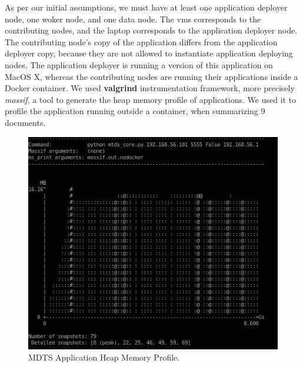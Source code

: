 \documentclass[12pt, titlepage]{uo_temp}
\begin{document}
     As per our initial assumptions, we must have at least one application deployer node,
     one woker node, and one data node. The \gls{vm}s corresponds to the contributing
     nodes, and the laptop corresponds to the application deployer node. The contributing
     node's copy of the application differs from the application deployer copy, because
     they are not allowed to instantiate application deploying nodes. The application
     deployer is running a version of this application on MacOS X, whereas the
     contributing nodes are running their applications inside a Docker container. We used
     \textbf{valgrind} instrumentation framework, more precisely \emph{massif}, a tool
     to generate the heap memory profile of applications. We used it to profile the
     application running outside a container, when summarizing 9 documents.
     \begin{figure}[h!]
       \centering
       \includegraphics{images/mdts_heap_mem_profile.png}
       \caption{MDTS Application Heap Memory Profile.}\label{profile_mem}
     \end{figure}
\end{document}
